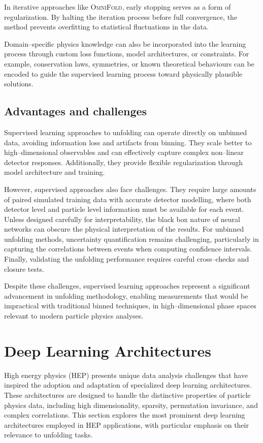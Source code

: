         In iterative approaches like \textsc{OmniFold}, early stopping serves as a form of regularization.
        By halting the iteration process before full convergence, the method prevents overfitting to statistical fluctuations in the data.

        Domain--specific physics knowledge can also be incorporated into the learning process through custom loss functions, model architectures, or constraints.
        For example, conservation laws, symmetries, or known theoretical behaviours can be encoded to guide the supervised learning process toward physically plausible solutions.
    \subsection{Advantages and challenges}
        Supervised learning approaches to unfolding can operate directly on unbinned data, avoiding information loss and artifacts from binning.
        They scale better to high--dimensional observables and can effectively capture complex non--linear detector responses.
        Additionally, they provide flexible regularization through model architecture and training.

        However, supervised approaches also face challenges.
        They require large amounts of paired simulated training data with accurate detector modelling, where both detector level and particle level information must be available for each event.
        Unless designed carefully for interpretability, the black box nature of neural networks can obscure the physical interpretation of the results.
        For unbinned unfolding methods, uncertainty quantification remains challenging, particularly in capturing the correlations between events when computing confidence intervals.
        Finally, validating the unfolding performance requires careful cross--checks and closure tests.

        Despite these challenges, supervised learning approaches represent a significant advancement in unfolding methodology, enabling measurements that would be impractical with traditional binned techniques,  in high--dimensional phase spaces relevant to modern particle physics analyses.



\section{Deep Learning Architectures}
High energy physics (HEP) presents unique data analysis challenges that have inspired the adoption and adaptation of specialized deep learning architectures.
%
These architectures are designed to handle the distinctive properties of particle physics data, including high dimensionality, sparsity, permutation invariance, and complex correlations.
%
This section explores the most prominent deep learning architectures employed in HEP applications, with particular emphasis on their relevance to unfolding tasks.
